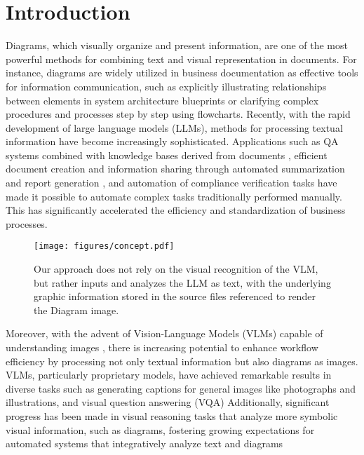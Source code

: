 \section{Introduction}
\label{sec:intro}
Diagrams, which visually organize and present information, are one of the most powerful methods for combining text and visual representation in documents. For instance, diagrams are widely utilized in business documentation as effective tools for information communication, such as explicitly illustrating relationships between elements in system architecture blueprints or clarifying complex procedures and processes step by step using flowcharts. 
Recently, with the rapid development of large language models (LLMs)\citep{openai_gpt-4_2024, anil_palm_2023}, methods for processing textual information have become increasingly sophisticated. Applications such as QA systems combined with knowledge bases derived from documents \citep{krishna_fact_2024, fleischer_rag_2024}, efficient document creation and information sharing through automated summarization and report generation \citep{thoppilan_lamda_2022, liu_mmbench_2025}, and automation of compliance verification tasks \citep{cava_safeguarding_2024, kande_security_2024, sollenberger_llm4vv_2024} have made it possible to automate complex tasks traditionally performed manually. This has significantly accelerated the efficiency and standardization of business processes.

\begin{figure}[tbp]
    \vspace{-5pt}
    \centering
    \texttt{[image: figures/concept.pdf]}
    \caption{\small
    Our approach does not rely on the visual recognition of the VLM, but rather inputs and analyzes the LLM as text, with the underlying graphic information stored in the source files referenced to render the Diagram image.
    }
    \label{fig:concept}
    \vspace{-10pt}
\end{figure}

Moreover, with the advent of Vision-Language Models (VLMs) capable of understanding images \citep{openai_gpt-4o_2024, noauthor_gpt-4vision_2023, fu_vita-15_2025, noauthor_introducing_2024}, there is increasing potential to enhance workflow efficiency by processing not only textual information but also diagrams as images.
VLMs, particularly proprietary models, have achieved remarkable results in diverse tasks such as generating captions for general images like photographs and illustrations, and visual question answering (VQA) \citep{openai_gpt-4o_2024, noauthor_introducing_2024}
Additionally, significant progress has been made in visual reasoning tasks that analyze more symbolic visual information, such as diagrams, fostering growing expectations for automated systems that integratively analyze text and diagrams\citep{lu_mathvista_2024, zhang_mathverse_2024, chen_how_2024}

